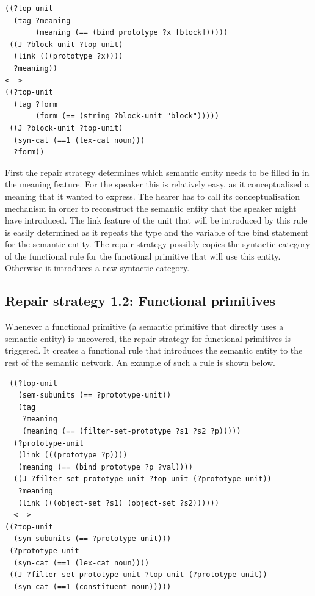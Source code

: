 \footnotesize
{}
\begin{lstlisting}
((?top-unit
  (tag ?meaning 
       (meaning (== (bind prototype ?x [block])))))
 ((J ?block-unit ?top-unit)
  (link (((prototype ?x))))
  ?meaning))
<-->
((?top-unit
  (tag ?form 
       (form (== (string ?block-unit "block")))))
 ((J ?block-unit ?top-unit) 
  (syn-cat (==1 (lex-cat noun)))
  ?form))
\end{lstlisting}
\normalsize

First the repair strategy determines which semantic entity needs to
be filled in in the meaning feature. For the speaker this is
relatively easy, as it conceptualised a meaning that it wanted to
express. The hearer has to call its conceptualisation mechanism in
order to reconstruct the semantic entity that the speaker might have
introduced. The link feature of the unit that will be introduced by
this rule is easily determined as it repeats the type and the variable
of the bind statement for the semantic entity. The repair strategy
possibly copies the syntactic category of the functional rule for the
functional primitive that will use this entity. Otherwise it
introduces a new syntactic category.

\subsection{Repair strategy 1.2: Functional primitives}

Whenever a functional primitive (a semantic primitive that directly
uses a semantic entity) is uncovered, the repair strategy for
functional primitives is triggered. It creates a functional rule that
introduces the semantic entity to the rest of the semantic network. An
example of such a rule is shown below.

\footnotesize
{}
\begin{lstlisting}
 ((?top-unit
   (sem-subunits (== ?prototype-unit))
   (tag
    ?meaning
    (meaning (== (filter-set-prototype ?s1 ?s2 ?p)))))
  (?prototype-unit
   (link (((prototype ?p))))
   (meaning (== (bind prototype ?p ?val))))
  ((J ?filter-set-prototype-unit ?top-unit (?prototype-unit))
   ?meaning
   (link (((object-set ?s1) (object-set ?s2))))))
  <-->
((?top-unit 
  (syn-subunits (== ?prototype-unit)))
 (?prototype-unit 
  (syn-cat (==1 (lex-cat noun))))
 ((J ?filter-set-prototype-unit ?top-unit (?prototype-unit))
  (syn-cat (==1 (constituent noun)))))
\end{lstlisting}
\normalsize

